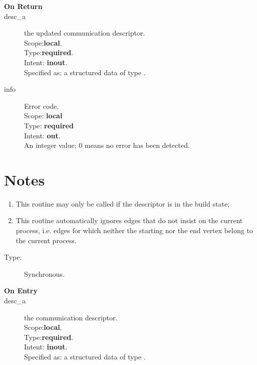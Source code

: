 \begin{description}
\item[\bf On Return]
\item[desc\_a] the updated communication descriptor.\\
Scope:{\bf local}.\\
Type:{\bf required}.\\
Intent: {\bf inout}.\\
Specified as: a structured data of type \descdata.
\item[info] Error code.\\
Scope: {\bf local} \\
Type: {\bf required} \\
Intent: {\bf out}.\\
An integer value; 0 means no error has been detected. 
\end{description}
\section*{Notes}
\begin{enumerate}
\item This routine may only be called if the descriptor is in the
  build state;
\item  This routine automatically ignores edges that do not
insist on the  current process, i.e. edges for which neither the starting
nor the end vertex belong to the current process. 
\end{enumerate}



%
%


\begin{description}
\item[Type:] Synchronous.
\item[\bf On Entry]
\item[desc\_a] the communication descriptor.\\
Scope:{\bf local}.\\
Type:{\bf required}.\\
Intent: {\bf inout}.\\
Specified as: a structured data of type \descdata.
\end{description}

